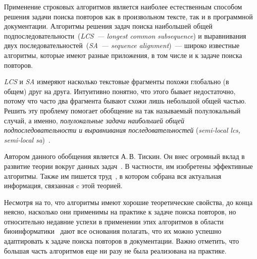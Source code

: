 
Применение строковых алгоритмов является наиболее естественным способом решения задачи поиска повторов как в произвольном тексте, так и в программной документации.
Алгоритмы решения задач поиска наибольшей общей подпоследовательности~(\emph{LCS~--- longest common subsequence}) и выравнивания двух последовательностей~(\emph{SA~--- sequence alignment})~--- широко известные алгоритмы, которые имеют разные приложения, в том числе и к задаче поиска повторов.

\emph{LCS} и \emph{SA} измеряют насколько текстовые фрагменты похожи глобально (в общем) друг на друга. 
Интуитивно понятно, что этого бывает недостаточно, потому что часто два фрагмента бывают схожи лишь небольшой общей частью.
Решить эту проблему помогает обобщение на так называемый полулокальный случай, а именно, \emph{полулокальные задачи наибольшей общей подпоследовательности и выравнивания последовательностей} (\emph{semi-local lcs, semi-local sa})~\cite{tiskin2006all}.

Автором данного обобщения является А.\,В. Тискин.
Он внес огромный вклад в развитие теории вокруг данных задач~\cite{tiskin2015fast,tiskin2019bounded,krusche2009parallel,tiskin2006longest,tiskin2008semi,tiskin2011towards}.
В частности, им изобретены эффективные алгоритмы.
Также им пишется труд~\cite{tiskin2006all}, в котором собрана вся актуальная информация, связанная c этой теорией.




Несмотря на то, что алгоритмы имеют хорошие теоретические свойства, до конца неясно, насколько они применимы на практике к задаче поиска повторов, но
относительно недавние успехи в применении этих алгоритмов в области биоинформатики~\cite{baxter2012conserved,davies2015analysis, picot2010evolutionary} дают все основания полагать, что их можно успешно адаптировать к задаче поиска повторов в документации.
Важно отметить, что большая часть алгоритмов еще ни разу не была реализована на практике.

